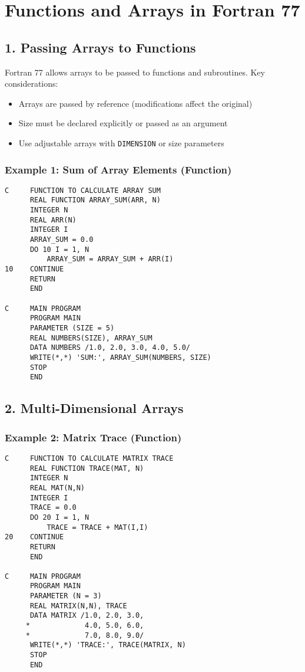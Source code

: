 \documentclass{book}
\begin{document}
\section{Functions and Arrays in Fortran 77}

\subsection*{1. Passing Arrays to Functions}
Fortran 77 allows arrays to be passed to functions and subroutines. Key considerations:
\begin{itemize}
\item Arrays are passed by reference (modifications affect the original)
\item Size must be declared explicitly or passed as an argument
\item Use adjustable arrays with \texttt{DIMENSION} or size parameters
\end{itemize}

\subsubsection*{Example 1: Sum of Array Elements (Function)}
\begin{verbatim}
C     FUNCTION TO CALCULATE ARRAY SUM
      REAL FUNCTION ARRAY_SUM(ARR, N)
      INTEGER N
      REAL ARR(N)
      INTEGER I
      ARRAY_SUM = 0.0
      DO 10 I = 1, N
          ARRAY_SUM = ARRAY_SUM + ARR(I)
10    CONTINUE
      RETURN
      END

C     MAIN PROGRAM
      PROGRAM MAIN
      PARAMETER (SIZE = 5)
      REAL NUMBERS(SIZE), ARRAY_SUM
      DATA NUMBERS /1.0, 2.0, 3.0, 4.0, 5.0/
      WRITE(*,*) 'SUM:', ARRAY_SUM(NUMBERS, SIZE)
      STOP
      END
\end{verbatim}

\subsection*{2. Multi-Dimensional Arrays}
\subsubsection*{Example 2: Matrix Trace (Function)}
\begin{verbatim}
C     FUNCTION TO CALCULATE MATRIX TRACE
      REAL FUNCTION TRACE(MAT, N)
      INTEGER N
      REAL MAT(N,N)
      INTEGER I
      TRACE = 0.0
      DO 20 I = 1, N
          TRACE = TRACE + MAT(I,I)
20    CONTINUE
      RETURN
      END

C     MAIN PROGRAM
      PROGRAM MAIN
      PARAMETER (N = 3)
      REAL MATRIX(N,N), TRACE
      DATA MATRIX /1.0, 2.0, 3.0,
     *             4.0, 5.0, 6.0,
     *             7.0, 8.0, 9.0/
      WRITE(*,*) 'TRACE:', TRACE(MATRIX, N)
      STOP
      END
\end{verbatim}
\end{document}
